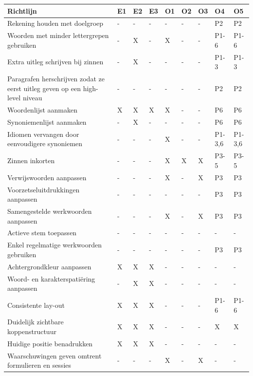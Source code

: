 \begin{table}[H]
	\centering
	\begin{tabular}{ | m{8cm} | m{0.5cm} | m{0.5cm} | m{0.5cm} | m{0.5cm} | m{0.5cm} | m{0.5cm} | m{1cm} | m{1cm} | }
		\hline
		\textbf{Richtlijn} & \textbf{E1} & \textbf{E2} & \textbf{E3} & \textbf{O1} & \textbf{O2} & \textbf{O3} & \textbf{O4} & \textbf{O5} \\ \hline
		Rekening houden met doelgroep & - & - & - & - & - & - & P2 & P2 \\ \hline
		Woorden met minder lettergrepen gebruiken & - & X & - & X & - & - & P1-6 & P1-6 \\ \hline
		Extra uitleg schrijven bij zinnen & - & X & - & - & - & - & P1-3 & P1-3 \\ \hline
		Paragrafen herschrijven zodat ze eerst uitleg geven op een high-level niveau & - & - & - & - & - & - & P2 & P2 \\ \hline
		Woordenlijst aanmaken & X & X & X & X & - & - & P6 & P6 \\ \hline
		Synoniemenlijst aanmaken & - & X & - & - & - & - & P6 & P6 \\ \hline
		Idiomen vervangen door eenvoudigere synoniemen & - & - & - & X & - & - & P1-3,6 & P1-3,6 \\ \hline
		Zinnen inkorten & - & - & - & X & X & X & P3-5 & P3-5 \\ \hline
		Verwijswoorden aanpassen & - & - & - & X & - & X & P3 & P3 \\ \hline
		Voorzetseluitdrukkingen aanpassen & - & - & - & - & - & - & P3 & P3 \\ \hline
		Samengestelde werkwoorden aanpassen & - & - & - & X & - & X & P3 & P3 \\ \hline
		Actieve stem toepassen & - & - & - & - & - & - & - & - \\ \hline
		Enkel regelmatige werkwoorden gebruiken & - & - & - & - & - & - & P3 & P3 \\ \hline
		Achtergrondkleur aanpassen & X & X & X & - & - & - & - & - \\ \hline
		Woord- en karakterspatiëring aanpassen & - & X & X & - & - & - & - & - \\ \hline
		Consistente lay-out & X & X & X & - & - & - & P1-6 & P1-6 \\ \hline
		Duidelijk zichtbare koppenstructuur & X & X & X & - & - & - & X & X \\ \hline
		Huidige positie benadrukken & X & X & X & - & - & - & - & - \\ \hline
		Waarschuwingen geven omtrent formulieren en sessies & - & - & - & X & - & X & - & - \\ \hline

\end{tabular}
\end{table}
